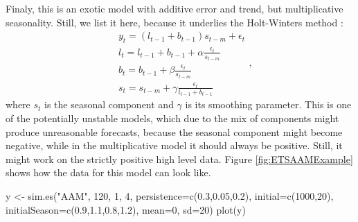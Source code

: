\documentclass[
]{book}
\newenvironment{Shaded}{\begin{snugshade}}{\end{snugshade}}
\newcommand{\AttributeTok}[1]{\textcolor[rgb]{0.77,0.63,0.00}{#1}}
\newcommand{\DecValTok}[1]{\textcolor[rgb]{0.00,0.00,0.81}{#1}}
\newcommand{\FloatTok}[1]{\textcolor[rgb]{0.00,0.00,0.81}{#1}}
\newcommand{\FunctionTok}[1]{\textcolor[rgb]{0.00,0.00,0.00}{#1}}
\newcommand{\NormalTok}[1]{#1}
\newcommand{\OtherTok}[1]{\textcolor[rgb]{0.56,0.35,0.01}{#1}}
\newcommand{\StringTok}[1]{\textcolor[rgb]{0.31,0.60,0.02}{#1}}
\theoremstyle{definition}
\theoremstyle{definition}
\theoremstyle{definition}
\theoremstyle{definition}
\theoremstyle{remark}
\begin{document}
Finaly, this is an exotic model with additive error and trend, but multiplicative seasonality. Still, we list it here, because it underlies the Holt-Winters method \citep{Winters1960}:
\begin{equation}
  \begin{aligned}
    & y_{t} = (l_{t-1} + b_{t-1}) s_{t-m} + \epsilon_t \\
    & l_t = l_{t-1} + b_{t-1} + \alpha \frac{\epsilon_t}{s_{t-m}} \\
    & b_t = b_{t-1} + \beta \frac{\epsilon_t}{s_{t-m}} \\
    & s_t = s_{t-m} + \gamma \frac{\epsilon_t}{l_{t-1}+b_{t-1}}
  \end{aligned} ,
  \label{eq:ETSAAM}
\end{equation}
where \(s_t\) is the seasonal component and \(\gamma\) is its smoothing parameter. This is one of the potentially unstable models, which due to the mix of components might produce unreasonable forecasts, because the seasonal component might become negative, while in the multiplicative model it should always be positive. Still, it might work on the strictly positive high level data. Figure \ref{fig:ETSAAMExample} shows how the data for this model can look like.

\begin{Shaded}
\begin{Highlighting}[]
\NormalTok{y }\OtherTok{\textless{}{-}} \FunctionTok{sim.es}\NormalTok{(}\StringTok{"AAM"}\NormalTok{, }\DecValTok{120}\NormalTok{, }\DecValTok{1}\NormalTok{, }\DecValTok{4}\NormalTok{, }\AttributeTok{persistence=}\FunctionTok{c}\NormalTok{(}\FloatTok{0.3}\NormalTok{,}\FloatTok{0.05}\NormalTok{,}\FloatTok{0.2}\NormalTok{),}
            \AttributeTok{initial=}\FunctionTok{c}\NormalTok{(}\DecValTok{1000}\NormalTok{,}\DecValTok{20}\NormalTok{), }\AttributeTok{initialSeason=}\FunctionTok{c}\NormalTok{(}\FloatTok{0.9}\NormalTok{,}\FloatTok{1.1}\NormalTok{,}\FloatTok{0.8}\NormalTok{,}\FloatTok{1.2}\NormalTok{),}
            \AttributeTok{mean=}\DecValTok{0}\NormalTok{, }\AttributeTok{sd=}\DecValTok{20}\NormalTok{)}
\FunctionTok{plot}\NormalTok{(y)}
\end{Highlighting}
\end{Shaded}
\end{document}
